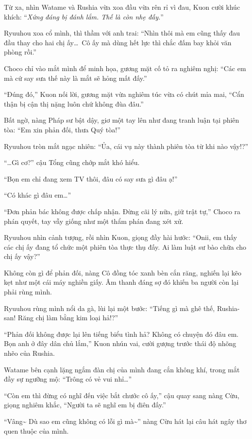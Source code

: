 \documentclass[../main.tex]{subfiles}
\begin{document}
Từ xa, nhìn Watame và Rushia vừa xoa đầu vừa rên rỉ vì đau, Kuon cười khúc khích: ``\textit{Xứng đáng bị đánh lắm. Thế là còn nhẹ đấy.}''

Ryuuhou xoa cổ mình, thì thầm với anh trai: ``Nhìn thôi mà em cũng thấy đau đầu thay cho hai chị ấy\dots\ Cô ấy mà dùng hết lực thì chắc đấm bay khỏi văn phòng rồi.''

Choco chỉ vào mắt mình để minh họa, gương mặt cố tỏ ra nghiêm nghị: ``Các em mà cứ say sưa thế này là mắt sẽ hỏng mất đấy.''

``Đúng đó,'' Kuon nối lời, gương mặt vừa nghiêm túc vừa có chút mỉa mai, ``Cẩn thận bị cận thị nặng luôn chứ không đùa đâu.''

Bất ngờ, nàng Pháp sư bật dậy, giơ một tay lên như đang tranh luận tại phiên tòa: ``Em xin phản đối, thưa Quý tòa!''

Ryuuhou tròn mắt ngạc nhiên: ``Ủa, cái vụ này thành phiên tòa từ khi nào vậy!?''

``\dots Gì cơ?'' cậu Tổng cũng chớp mắt khó hiểu.

``Bọn em chỉ đang xem TV thôi, đâu có say sưa gì đâu ạ!''

``Có khác gì đâu em\dots''

``Đơn phản bác không được chấp nhận. Đừng cãi lý nữa, giữ trật tự,'' Choco ra phán quyết, tay vẫy giống như một thẩm phán đang xét xử.

Ryuuhou nhìn cảnh tượng, rồi nhìn Kuon, giọng đầy hài hước: ``Onii, em thấy các chị ấy đang tổ chức một phiên tòa thực thụ đấy. Ai làm luật sư bào chữa cho chị ấy vậy?''

Không còn gì để phản đối, nàng Cô đồng tóc xanh bèn cắn răng, nghiến lại kẽo kẹt như một cái máy nghiền giấy. Âm thanh đáng sợ đó khiến ba người còn lại phải rùng mình.

Ryuuhou rùng mình nổi da gà, lùi lại một bước: ``Tiếng gì mà ghê thế, Rushia-san! Răng chị làm bằng kim loại hả!?''

``Phản đối không được lại lên tiếng biểu tình hả? Không có chuyện đó đâu em. Bọn anh ở đây dân chủ lắm,'' Kuon nhún vai, cười gượng trước thái độ nhõng nhẽo của Rushia.

Watame bên cạnh lặng ngắm đàn chị của mình đang cắn không khí, trong mắt đầy sự ngưỡng mộ: ``Trông có vẻ vui nhỉ\dots''

``Còn em thì đừng có nghĩ đến việc bắt chước cô ấy,'' cậu quay sang nàng Cừu, giọng nghiêm khắc, ``Người ta sẽ nghĩ em bị điên đấy.''

``Vâng\~{} Dù sao em cũng không có lỗi gì mà\~{}'' nàng Cừu hát lại câu hát ngây thơ quen thuộc của mình.
\end{document}
